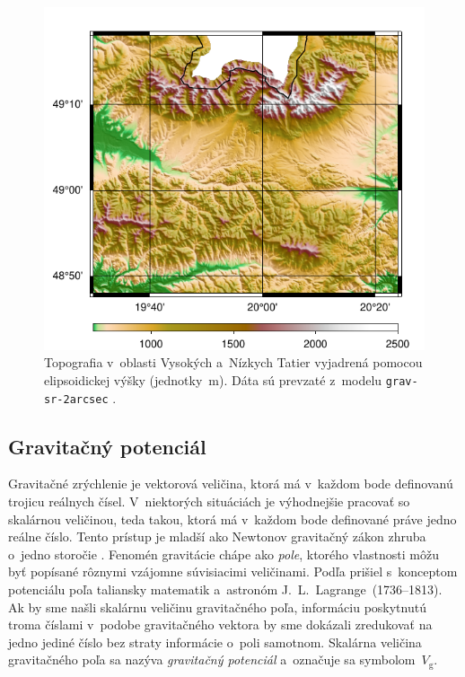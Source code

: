 \documentclass[a4paper,12pt]{book}
\newcommand{\gidx}{\mathrm g}
\begin{document}
\begin{figure}
\centering
\includegraphics{./fig-h-grav-sr-2arcsec.pdf}
\caption{Topografia v~oblasti Vysokých a~Nízkych Tatier vyjadrená pomocou 
elipsoidickej výšky (jednotky~m).  Dáta sú prevzaté z~modelu 
\texttt{grav-sr-2arcsec} \parencite{GravSR2arcsec}.}
\label{fig:h_grav_sr_2arcsec}
\end{figure}







\subsection{Gravitačný potenciál}
\label{sec:vg}

Gravitačné zrýchlenie je vektorová veličina, ktorá má v~každom bode definovanú 
trojicu reálnych čísel.  V~niektorých situáciách je výhodnejšie pracovať so 
skalárnou veličinou, teda takou, ktorá má v~každom bode definované práve jedno 
reálne číslo.  Tento prístup je mladší ako Newtonov gravitačný zákon zhruba 
o~jedno storočie \parencite{MacMillan1930,Jekeli2015}.  Fenomén gravitácie 
chápe ako \emph{pole}, ktorého vlastnosti môžu byť popísané rôznymi vzájomne 
súvisiacimi veličinami.  Podľa \textcite{MacMillan1930} prišiel s~konceptom 
potenciálu poľa taliansky matematik a~astronóm J.~L.~Lagrange~(1736--1813).  Ak 
by sme našli skalárnu veličinu gravitačného poľa, informáciu poskytnutú troma 
číslami v~podobe gravitačného vektora by sme dokázali zredukovať na jedno 
jediné číslo bez straty informácie o~poli samotnom.  Skalárna veličina 
gravitačného poľa sa nazýva \emph{gravitačný potenciál} a~označuje sa 
symbolom~$V_\gidx$.
\end{document}
